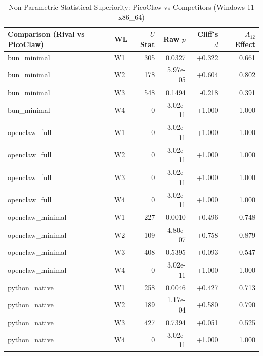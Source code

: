 \begin{table}[t]
\centering\small
\caption{Non-Parametric Statistical Superiority: PicoClaw vs Competitors (Windows 11 x86_64)}
\label{tab:Windows_stat_tests}
\begin{tabular}{llrrrr}
\toprule
Comparison (Rival vs PicoClaw) & WL & $U$ Stat & Raw $p$ & Cliff's $d$ & $A_{12}$ Effect \\
\midrule
bun\_minimal & W1 & 305 & 0.0327 & +0.322 & 0.661 \\
bun\_minimal & W2 & 178 & 5.97e-05 & +0.604 & 0.802 \\
bun\_minimal & W3 & 548 & 0.1494 & -0.218 & 0.391 \\
bun\_minimal & W4 & 0 & 3.02e-11 & +1.000 & 1.000 \\
openclaw\_full & W1 & 0 & 3.02e-11 & +1.000 & 1.000 \\
openclaw\_full & W2 & 0 & 3.02e-11 & +1.000 & 1.000 \\
openclaw\_full & W3 & 0 & 3.02e-11 & +1.000 & 1.000 \\
openclaw\_full & W4 & 0 & 3.02e-11 & +1.000 & 1.000 \\
openclaw\_minimal & W1 & 227 & 0.0010 & +0.496 & 0.748 \\
openclaw\_minimal & W2 & 109 & 4.80e-07 & +0.758 & 0.879 \\
openclaw\_minimal & W3 & 408 & 0.5395 & +0.093 & 0.547 \\
openclaw\_minimal & W4 & 0 & 3.02e-11 & +1.000 & 1.000 \\
python\_native & W1 & 258 & 0.0046 & +0.427 & 0.713 \\
python\_native & W2 & 189 & 1.17e-04 & +0.580 & 0.790 \\
python\_native & W3 & 427 & 0.7394 & +0.051 & 0.525 \\
python\_native & W4 & 0 & 3.02e-11 & +1.000 & 1.000 \\
\bottomrule
\end{tabular}
\end{table}
